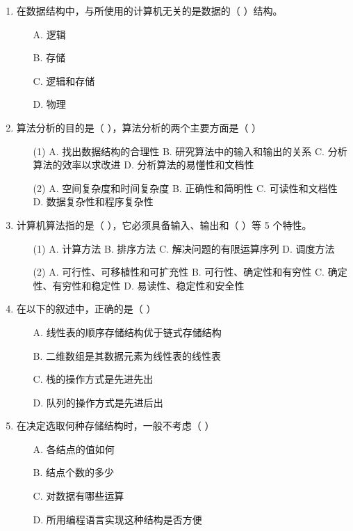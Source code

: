 \documentclass[12pt, a4paper]{article}
\begin{document}
\begin{enumerate}[label=\arabic*.]
	\item 在数据结构中，与所使用的计算机无关的是数据的（ ）结构。
	      \begin{enumerate}
		      \item[A.] 逻辑
		      \item[B.] 存储
		      \item[C.] 逻辑和存储
		      \item[D.] 物理
	      \end{enumerate}

	\item 算法分析的目的是（ ），算法分析的两个主要方面是（ ）
	      \begin{enumerate}
		      \item[(1)] A. 找出数据结构的合理性 \quad B. 研究算法中的输入和输出的关系 \quad C. 分析算法的效率以求改进 \quad D. 分析算法的易懂性和文档性
		      \item[(2)] A. 空间复杂度和时间复杂度 \quad B. 正确性和简明性 \quad C. 可读性和文档性 \quad D. 数据复杂性和程序复杂性
	      \end{enumerate}

	\item 计算机算法指的是（ ），它必须具备输入、输出和（ ）等 5 个特性。
	      \begin{enumerate}
		      \item[(1)] A. 计算方法 \quad B. 排序方法 \quad C. 解决问题的有限运算序列 \quad D. 调度方法
		      \item[(2)] A. 可行性、可移植性和可扩充性 \quad B. 可行性、确定性和有穷性 \quad C. 确定性、有穷性和稳定性 \quad D. 易读性、稳定性和安全性
	      \end{enumerate}

	\item 在以下的叙述中，正确的是（ ）
	      \begin{enumerate}
		      \item[A.] 线性表的顺序存储结构优于链式存储结构
		      \item[B.] 二维数组是其数据元素为线性表的线性表
		      \item[C.] 栈的操作方式是先进先出
		      \item[D.] 队列的操作方式是先进后出
	      \end{enumerate}

	\item 在决定选取何种存储结构时，一般不考虑（ ）
	      \begin{enumerate}
		      \item[A.] 各结点的值如何
		      \item[B.] 结点个数的多少
		      \item[C.] 对数据有哪些运算
		      \item[D.] 所用编程语言实现这种结构是否方便
	      \end{enumerate}


\end{enumerate}
\end{document}
